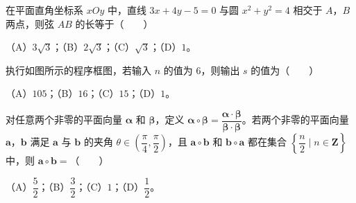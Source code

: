 \begin{question}
在平面直角坐标系 $xOy$ 中，直线 $3x+4y-5=0$ 与圆 $x^2+y^2=4$ 相交于 $A$，$B$ 两点，则弦 $AB$ 的长等于\mbox{（　　）}

（A）$3\sqrt3$；（B）$2\sqrt3$；（C）$\sqrt3$；（D）$1$。

\Needspace{0.4\textheight}
\end{question}
\begin{question}
执行如图所示的程序框图，若输入 $n$ 的值为 $6$，则输出 $s$ 的值为\mbox{（　　）}
\nopagebreak[4]
\begin{center}\end{center}
\nopagebreak[4]
（A）$105$；（B）$16$；（C）$15$；（D）$1$。

\end{question}
\begin{question}
对任意两个非零的平面向量 $\boldsymbol\alpha$ 和 $\boldsymbol\beta$，定义 $\boldsymbol\alpha\circ\boldsymbol\beta=\dfrac{\boldsymbol\alpha\cdot\boldsymbol\beta}{\boldsymbol\beta\cdot\boldsymbol\beta}$。若两个非零的平面向量 $\boldsymbol a$，$\boldsymbol b$ 满足 $\boldsymbol a$ 与 $\boldsymbol b$ 的夹角 $\theta\in\left(\dfrac\pi4,\dfrac\pi2\right)$，且 $\boldsymbol a\circ\boldsymbol b$ 和 $\boldsymbol b\circ\boldsymbol a$ 都在集合 $\left\{\dfrac n2\mid n\in\mathbf Z\right\}$ 中，则 $\boldsymbol a\circ\boldsymbol b=$\mbox{（　　）}

（A）$\dfrac52$；（B）$\dfrac32$；（C）$1$；（D）$\dfrac12$。

\end{question}

